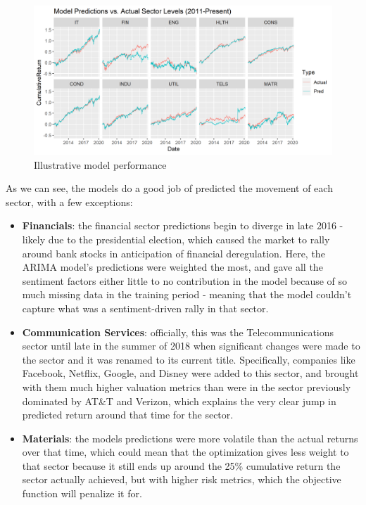 \documentclass[]{article}
\begin{document}
\begin{figure}[H]
\centering
\includegraphics{./results/20200228/modelAssessment.png}
\caption{Illustrative model performance}
\end{figure}

As we can see, the models do a good job of predicted the movement of
each sector, with a few exceptions: 

\begin{itemize}
\item\textbf{Financials}: the financial
sector predictions begin to diverge in late 2016 - likely due to the
presidential election, which caused the market to rally around bank
stocks in anticipation of financial deregulation. Here, the ARIMA
model's predictions were weighted the most, and gave all the sentiment
factors either little to no contribution in the model because of so much
missing data in the training period - meaning that the model couldn't
capture what was a sentiment-driven rally in that sector.
\item\textbf{Communication Services}: officially, this was the
Telecommunications sector until late in the summer of 2018 when
significant changes were made to the sector and it was renamed to its
current title. Specifically, companies like Facebook, Netflix, Google,
and Disney were added to this sector, and brought with them much higher
valuation metrics than were in the sector previously dominated by AT\&T
and Verizon, which explains the very clear jump in predicted return
around that time for the sector. 
\item\textbf{Materials}: the models
predictions were more volatile than the actual returns over that time,
which could mean that the optimization gives less weight to that sector
because it still ends up around the 25\% cumulative return the sector
actually achieved, but with higher risk metrics, which the objective
function will penalize it for.
\end{itemize}
\end{document}
